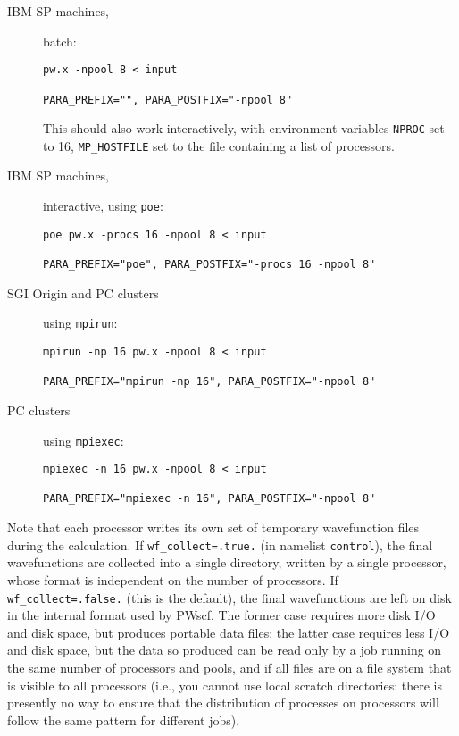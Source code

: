 \documentclass[12pt,a4paper]{article}
\begin{document}
\begin{description}
  \item [IBM SP machines,] batch:
\begin{verbatim}
pw.x -npool 8 < input

PARA_PREFIX="", PARA_POSTFIX="-npool 8"
\end{verbatim}
    This should also work interactively, with environment variables
    \texttt{NPROC} set to 16, \texttt{MP\_HOSTFILE} set to the file
    containing a list of processors.
  \item [IBM SP machines,] interactive, using \texttt{poe}:
\begin{verbatim}
poe pw.x -procs 16 -npool 8 < input

PARA_PREFIX="poe", PARA_POSTFIX="-procs 16 -npool 8"
\end{verbatim}
  \item [SGI Origin and PC clusters] using \texttt{mpirun}:
\begin{verbatim}
mpirun -np 16 pw.x -npool 8 < input

PARA_PREFIX="mpirun -np 16", PARA_POSTFIX="-npool 8"
\end{verbatim}
  \item [PC clusters] using \texttt{mpiexec}:
\begin{verbatim}
mpiexec -n 16 pw.x -npool 8 < input

PARA_PREFIX="mpiexec -n 16", PARA_POSTFIX="-npool 8"
\end{verbatim}

\end{description}

Note that each processor writes its own set of temporary wavefunction
files during the calculation. If \texttt{wf\_collect=.true.} (in namelist
\texttt{control}), the final wavefunctions are collected into a single
directory, written by a single processor, whose format is independent 
on the number of processors. If \texttt{wf\_collect=.false.} (this is the
default), the final wavefunctions are left on disk in the internal format 
used by PWscf. The former case requires more disk I/O and disk space,
but produces portable data files; the latter case requires less I/O and
disk space, but the data so produced can be read only by a job running on
the same number of processors and pools, and if all files are on a
file system that is visible to all processors (i.e., you cannot use
local scratch directories: there is presently no way to ensure that
the distribution of processes on processors will follow the same
pattern for different jobs).
\end{document}
